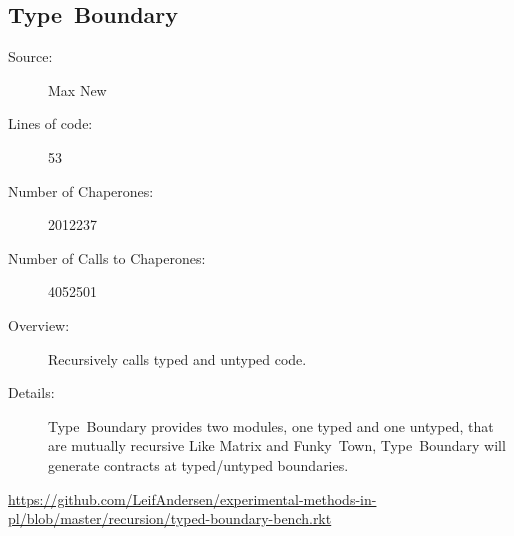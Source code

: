 \subsection*{Type~Boundary~\hrulefill}
\begin{description}
\item[Source:] Max New
\item[Lines of code:] 53
\item[Number of Chaperones:] 2012237
\item[Number of Calls to Chaperones:] 4052501
\item[Overview:]
  Recursively calls typed and untyped code.
\item[Details:]
  Type~Boundary provides two modules, one typed and one untyped, that are mutually recursive
  Like Matrix and Funky~Town, Type~Boundary will generate contracts at typed/untyped boundaries.
\end{description}
\url{https://github.com/LeifAndersen/experimental-methods-in-pl/blob/master/recursion/typed-boundary-bench.rkt}
